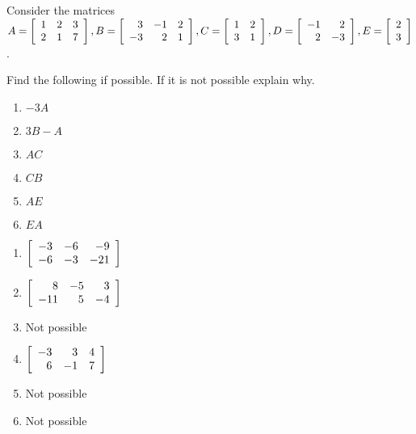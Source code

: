 \begin{enumialphparenastyle}

\begin{ex} Consider the matrices $
A =\left[
\begin{array}{rrr}
1 & 2 & 3 \\
2 & 1 & 7
\end{array}
\right],  B=\left[
\begin{array}{rrr}
3 & -1 & 2 \\
-3 & 2 & 1
\end{array}
\right], 
C =\left[
\begin{array}{rr}
1 & 2 \\
3 & 1
\end{array}
\right], \\ D=\left[
\begin{array}{rr}
-1 & 2 \\
2 & -3
\end{array}
\right],  E=\left[
\begin{array}{r}
2 \\
3
\end{array}
\right]$. 

Find the following if possible. If it is not possible explain why.
\begin{enumerate}  
\item $-3A$
\item $3B-A$
\item $AC$
\item $CB$
\item $AE$
\item $EA$
\end{enumerate}

\begin{sol}
\begin{enumerate}
\item $\left[
\begin{array}{rrr}
-3 & -6 & -9 \\
-6 & -3 & -21
\end{array}
\right]$
\item $\left[
\begin{array}{rrr}
8 & -5 & 3 \\
-11 & 5 & -4
\end{array}
\right]$
\item Not possible
\item $\left[
\begin{array}{rrr}
-3 & 3 & 4 \\
6 & -1 & 7
\end{array}
\right]$
\item Not possible
\item Not possible
\end{enumerate}
\end{sol}
\end{ex}


\end{enumialphparenastyle}
